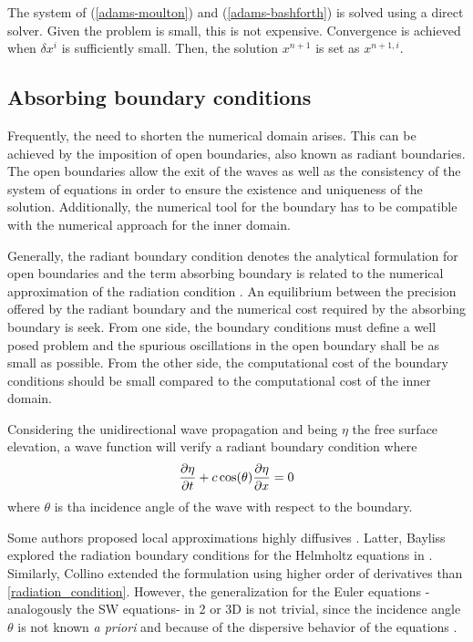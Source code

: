 The system of (\ref{adams-moulton}) and (\ref{adams-bashforth}) is solved using a direct solver. Given the problem is small, this is not expensive.
Convergence is achieved when $\delta x^i$ is sufficiently small. Then, the solution $x^{n+1}$ is set as $x^{n+1,i}$.





\subsection{Absorbing boundary conditions}

Frequently, the need to shorten the numerical domain arises. This can be achieved by the imposition of open boundaries, also known as radiant boundaries. The open boundaries allow the exit of the waves as well as the consistency of the system of equations in order to ensure the existence and uniqueness of the solution. Additionally, the numerical tool for the boundary has to be compatible with the numerical approach for the inner domain.

Generally, the radiant boundary condition denotes the analytical formulation for open boundaries and the term absorbing boundary is related to the numerical approximation of the radiation condition \cite{navon2004}. An equilibrium between the precision offered by the radiant boundary and the numerical cost required by the absorbing boundary is seek.
From one side, the boundary conditions must define a well posed problem and the spurious oscillations in the open boundary shall be as small as possible. From the other side, the computational cost of the boundary conditions should be small compared to the computational cost of the inner domain.

Considering the unidirectional wave propagation and being $\eta$ the free surface elevation, a wave function will verify a radiant boundary condition where
\begin{equation} \label{radiation_condition}
    \frac{\partial\eta}{\partial t} + c \cos(\theta)\frac{\partial\eta}{\partial x} = 0
\end{equation}
where $\theta$ is tha incidence angle of the wave with respect to the boundary.

Some authors proposed local approximations highly diffusives \cite{engquist1977}. Latter, Bayliss explored the radiation boundary conditions for the Helmholtz equations in \cite{bayliss1982}.
Similarly, Collino \cite{collino1993} extended the formulation using higher order of derivatives than \ref{radiation_condition}. However, the generalization for the Euler equations -analogously the SW equations- in 2 or 3D is not trivial, since the incidence angle $\theta$ is not known \emph{a priori} and because of the dispersive behavior of the equations \cite{wei1995}.

